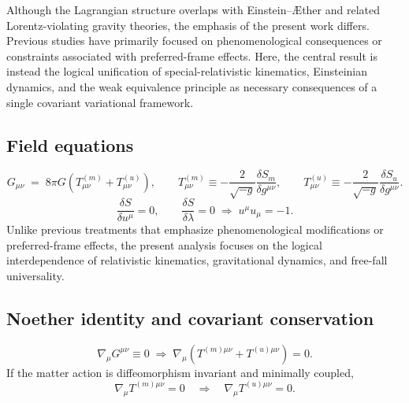 \documentclass[11pt]{article}
\begin{document}
            Although the Lagrangian structure overlaps with Einstein--\AE ther and related
            Lorentz-violating gravity theories, the emphasis of the present work differs.
            Previous studies have primarily focused on phenomenological consequences or
            constraints associated with preferred-frame effects.
            Here, the central result is instead the logical unification of special-relativistic
            kinematics, Einsteinian dynamics, and the weak equivalence principle as necessary
            consequences of a single covariant variational framework.

        \subsection{Field equations}
            \begin{equation}
                G_{\mu\nu} \;=\; 8\pi G \left(T^{(m)}_{\mu\nu} + T^{(u)}_{\mu\nu}\right),
                \qquad
                T^{(m)}_{\mu\nu}\equiv -\frac{2}{\sqrt{-g}}\frac{\delta S_m}{\delta g^{\mu\nu}},
                \qquad
                T^{(u)}_{\mu\nu}\equiv -\frac{2}{\sqrt{-g}}\frac{\delta S_u}{\delta g^{\mu\nu}}.
            \end{equation}
            \begin{equation}
                \frac{\delta S}{\delta u^\mu}=0,
                \qquad
                \frac{\delta S}{\delta \lambda}=0 \;\Rightarrow\; u^\mu u_\mu=-1.
            \end{equation}
            Unlike previous treatments that emphasize phenomenological modifications or
            preferred-frame effects, the present analysis focuses on the logical
            interdependence of relativistic kinematics, gravitational dynamics, and free-fall
            universality.

        \subsection{Noether identity and covariant conservation}
            \begin{equation}
                \nabla_\mu G^{\mu\nu} \equiv 0
                \;\Rightarrow\;
                \nabla_\mu\!\left(T^{(m)\mu\nu}+T^{(u)\mu\nu}\right)=0.
            \end{equation}
            If the matter action is diffeomorphism invariant and minimally coupled,
            \begin{equation}
                \nabla_\mu T^{(m)\mu\nu}=0
                \quad\Rightarrow\quad
                \nabla_\mu T^{(u)\mu\nu}=0.
            \end{equation}
\end{document}
